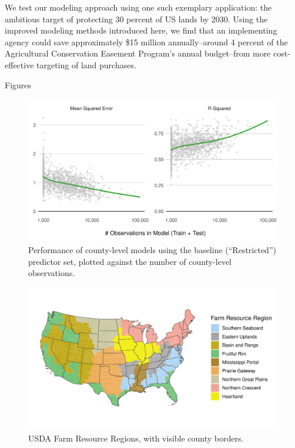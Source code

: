 \documentclass[12pt]{article}
\begin{document}
We test our modeling approach using one such exemplary application: the ambitious target of protecting 30 percent of US lands by 2030. Using the improved modeling methods introduced here, we find that an implementing agency could save approximately \$15 million annually--around 4 percent of the Agricultural Conservation Easement Program's annual budget--from more cost-effective targeting of land purchases.

\newpage

\vspace*{200pt}

\begin{huge}
    \begin{center}
        Figures
    \end{center}
\end{huge}

\newpage

\begin{figure}[H]
    \centering
    \includegraphics[width=1\textwidth]{exhibits/compare_county_nobs_perf.png}
    \caption{Performance of county-level models using the baseline (``Restricted'') predictor set, plotted against the number of county-level observations.}
    \label{fig:compare_county_nobs_perf}
\end{figure}

\begin{figure}[H]
    \centering
    \includegraphics[width=1\textwidth]{exhibits/FRR_map.png}
    \caption{USDA Farm Resource Regions, with visible county borders.}
    \label{fig:FRR_map}
\end{figure}
\end{document}
